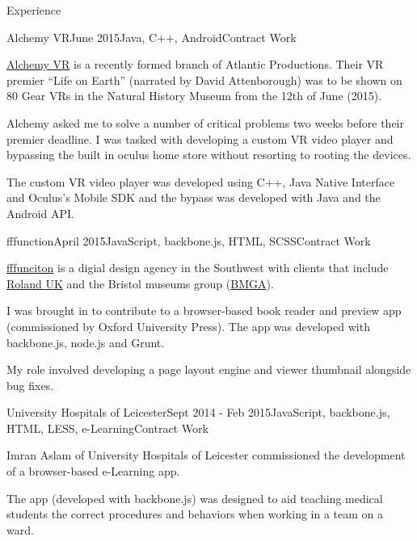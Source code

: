 \documentclass{resume} %
\begin{document}
\begin{rSection}{Experience}

\begin{rSubsection}{Alchemy VR}{June 2015}{Java, C++, Android}{Contract Work}
\item \href{http://www.alchemyvr.com/}{Alchemy VR} is a recently formed branch of Atlantic Productions. Their VR premier ``Life on Earth'' (narrated by David Attenborough) was to be shown on 80 Gear VRs in the Natural History Museum from the 12th of June (2015).
\item Alchemy asked me to solve a number of critical problems two weeks before their premier deadline. I was tasked with developing a custom VR video player and bypassing the built in oculus home store without resorting to rooting the devices.
\item The custom VR video player was developed using C++, Java Native Interface and Oculus's Mobile SDK and the bypass was developed with Java and the Android API.
\end{rSubsection}


\begin{rSubsection}{fffunction}{April 2015}{JavaScript, backbone.js, HTML, SCSS}{Contract Work}
\item \href{http://fffunction.co/}{fffunciton} is a digial design agency in the Southwest with clients that include \href{http://www.roland.co.uk}{Roland UK} and the Bristol museums group (\href{http://bristolmuseums.org.uk}{BMGA}).
\item I was brought in to contribute to a browser-based book reader and preview app (commissioned by Oxford University Press). The app was developed with backbone.js, node.js and Grunt. 
\item My role involved developing a page layout engine and viewer thumbnail alongside bug fixes.
\end{rSubsection}


\begin{rSubsection}{University Hospitals of Leicester}{Sept 2014 - Feb 2015}{JavaScript, backbone.js, HTML, LESS, e-Learning}{Contract Work}
\item Imran Aslam of University Hospitals of Leicester commissioned the development of a browser-based e-Learning app.
\item The app (developed with backbone.js) was designed to aid teaching medical students the correct procedures and behaviors when working in a team on a ward.
\end{rSubsection}


\end{rSection}
\end{document}
